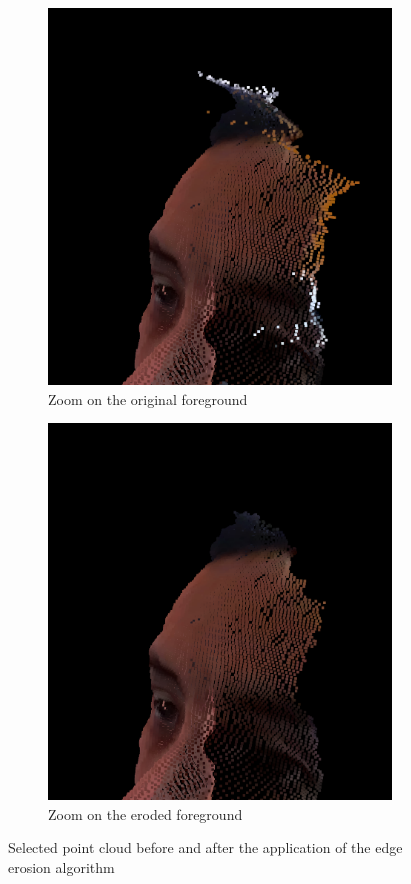 \begin{figure}[!ht]
\begin{multicols}{2}
        
        \begin{subfigure}{\linewidth}
               \centering
             \includegraphics[width=.8\linewidth]{images/visual_enhancement/edge/white_noise.png}
               \caption{Zoom on the original foreground}\label{figure:white_noise_2}
        \end{subfigure}
        
        
        \begin{subfigure}{\linewidth}
               \centering
             \includegraphics[width=.8\linewidth]{images/visual_enhancement/edge/eroded_noise_face.png}
               \caption{Zoom on the eroded foreground}\label{figure:eroded_noise_face}
        \end{subfigure}
\end{multicols}\vspace{-10pt}
\caption{Selected point cloud before and after the application of the edge erosion algorithm}
\label{figure:edge_result}

\end{figure}
